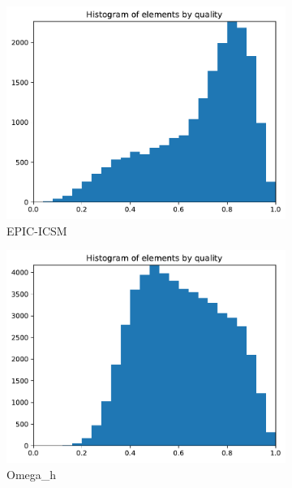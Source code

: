 \documentclass[3p,times,procedia,number]{elsarticle}
\begin{document}
\begin{figure}
\begin{subfigure}{.16\textwidth}
\includegraphics[width=\textwidth]{epic-icsm-cube-cylinder-polar-1-quality.pdf}
\caption{EPIC-ICSM}
\end{subfigure}
\begin{subfigure}{.16\textwidth}
\centering
\includegraphics[width=\textwidth]{omega_h-cube-cylinder-polar-1-quality.pdf}
\caption{Omega\_h}
\label{fig:omega_h-cube-cylinder-polar-1-quality}
\end{subfigure}
\begin{subfigure}{.16\textwidth}
\centering

\end{subfigure}
\end{figure}
\end{document}
